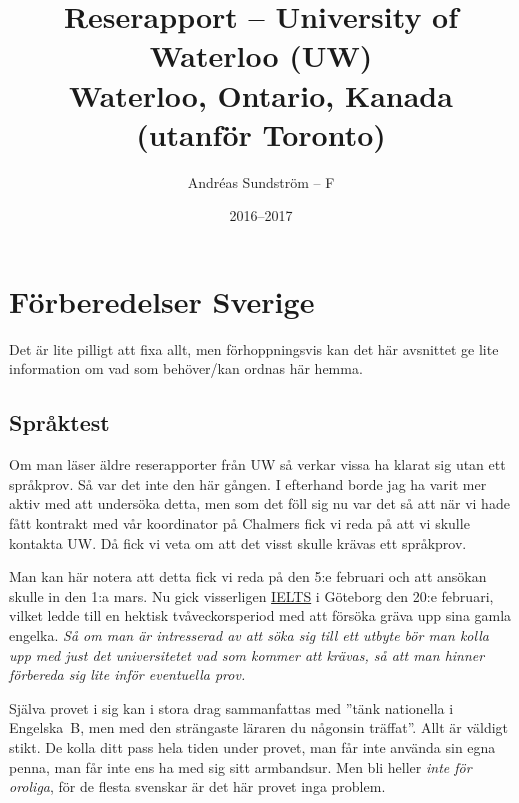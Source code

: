 \documentclass[11pt,a4paper, english, swedish]{article}
\begin{document}
\title{Reserapport -- University of Waterloo (UW) 
\\ \Large Waterloo, Ontario, Kanada \large(utanför Toronto)}
\author{Andréas Sundström -- F}
\date{2016--2017}

\maketitle

\section{Förberedelser Sverige}
Det är lite pilligt att fixa allt, men förhoppningsvis kan det här
avsnittet ge lite information om vad som behöver/kan ordnas här hemma.

\subsection{Språktest}
Om man läser äldre reserapporter från UW så verkar vissa ha klarat sig
utan ett språkprov. Så var det inte den här gången. I efterhand borde
jag ha varit mer aktiv med att undersöka detta, men som det föll sig
nu var det så att när vi hade fått kontrakt med vår koordinator på
Chalmers fick vi reda på att vi skulle kontakta UW\footnotemark{}.
Då fick vi veta om att det visst skulle krävas ett språkprov. 

Man kan här notera att detta fick vi reda på den 5:e februari och att
ansökan skulle in den 1:a mars. Nu gick visserligen
\href{http://www.folkuniversitetet.se/Las-mer-om-sprak/Sprakexamina/IELTS/IELTS-Goteborg/}{IELTS}
i Göteborg den 20:e februari, vilket ledde till en hektisk
tvåveckorsperiod med att försöka gräva upp sina gamla
engelka. \emph{Så om man är intresserad av att söka sig till ett
  utbyte bör man kolla upp med just det universitetet vad som kommer
  att krävas, så att man hinner förbereda sig lite inför eventuella
  prov.}

Själva provet i sig kan i stora drag sammanfattas med ''tänk
nationella i Engelska~B, men med den strängaste läraren du någonsin
träffat''. Allt är väldigt stikt. De kolla ditt pass hela tiden
under provet, man får inte använda sin egna penna, man får inte ens ha
med sig sitt armbandsur. Men bli heller \emph{inte för oroliga}, för
de flesta svenskar är det här provet inga problem. 
\end{document}
